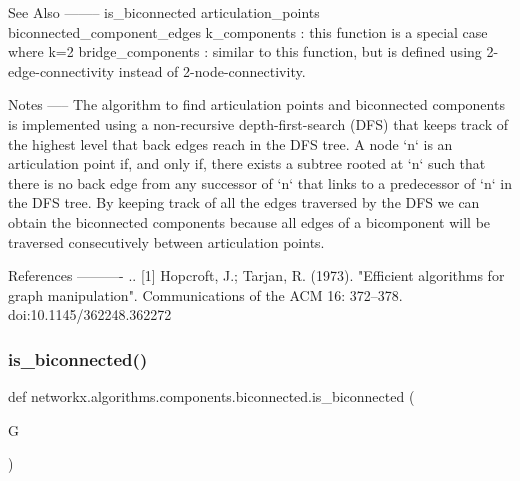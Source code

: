 \begin{DoxyVerb}
See Also
--------
is_biconnected
articulation_points
biconnected_component_edges
k_components : this function is a special case where k=2
bridge_components : similar to this function, but is defined using
    2-edge-connectivity instead of 2-node-connectivity.

Notes
-----
The algorithm to find articulation points and biconnected
components is implemented using a non-recursive depth-first-search
(DFS) that keeps track of the highest level that back edges reach
in the DFS tree.  A node `n` is an articulation point if, and only
if, there exists a subtree rooted at `n` such that there is no
back edge from any successor of `n` that links to a predecessor of
`n` in the DFS tree.  By keeping track of all the edges traversed
by the DFS we can obtain the biconnected components because all
edges of a bicomponent will be traversed consecutively between
articulation points.

References
----------
.. [1] Hopcroft, J.; Tarjan, R. (1973).
       "Efficient algorithms for graph manipulation".
       Communications of the ACM 16: 372–378. doi:10.1145/362248.362272\end{DoxyVerb}
 \mbox{\label{namespacenetworkx_1_1algorithms_1_1components_1_1biconnected_a883b29aa8dfc5ce49acd93d453d961f8}} 
\subsubsection{\texorpdfstring{is\+\_\+biconnected()}{is\_biconnected()}}
{\footnotesize\ttfamily def networkx.\+algorithms.\+components.\+biconnected.\+is\+\_\+biconnected (\begin{DoxyParamCaption}\item[{}]{G }\end{DoxyParamCaption})}

